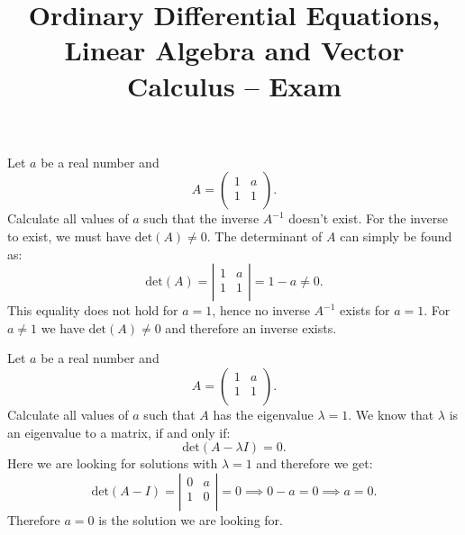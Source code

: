 \documentclass[a4paper]{article}
\title{Ordinary Differential Equations, Linear Algebra and Vector Calculus – Exam}
\begin{document}
\maketitle

Let $a$ be a real number and
\[ 
A = \begin{pmatrix}
1 & a\\
1 & 1\\
\end{pmatrix}
.\]
Calculate all values of $a$ such that the inverse $A^{-1}$ doesn't exist. 
\bigbreak
For the inverse to exist, we must have $\mathrm{det}(A) \neq 0$. The determinant of $A$ can simply be found as:
\[ 
\mathrm{det}(A) = \left| \begin{array}{cc}
1 & a\\
1 & 1\\
\end{array} \right| = 1 - a \neq 0
.\]
This equality does not hold for $a = 1$, hence no inverse $A^{-1}$ exists for $a = 1$. For $a \neq 1$ we have $\mathrm{det}(A)\neq 0$ and therefore an inverse exists.


Let $a$ be a real number and
\[ 
A = \begin{pmatrix}
1 & a\\
1 & 1\\
\end{pmatrix}
.\]
Calculate all values of $a$ such that $A$ has the eigenvalue $\lambda = 1$.
\bigbreak
We know that $\lambda$ is an eigenvalue to a matrix, if and only if:
\[ 
\mathrm{det}(A - \lambda I) = 0
.\]
Here we are looking for solutions with $\lambda = 1$ and therefore we get:
\[ 
\mathrm{det}(A - I) = \left| \begin{array}{cc}
0 & a\\
1 & 0\\
\end{array} \right| = 0 \implies 0 - a = 0 \implies a = 0
.\]
Therefore $a = 0$ is the solution we are looking for. 
\end{document}
